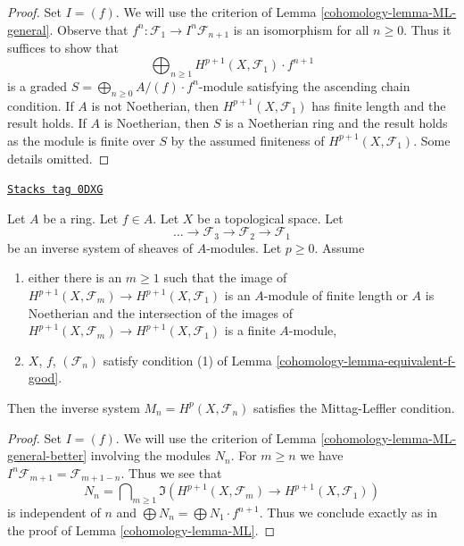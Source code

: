 \begin{proof}

Set $I = (f)$. We will use the criterion of Lemma \ref{cohomology-lemma-ML-general}.
Observe that $f^n : \mathcal{F}_1 \to I^n\mathcal{F}_{n + 1}$
is an isomorphism for all $n \geq 0$.
Thus it suffices to show that
$$
\bigoplus\nolimits_{n \geq 1} H^{p + 1}(X, \mathcal{F}_1) \cdot f^{n + 1}
$$
is a graded $S = \bigoplus_{n \geq 0} A/(f) \cdot f^n$-module satisfying the
ascending chain condition. If $A$ is not Noetherian, then
$H^{p + 1}(X, \mathcal{F}_1)$ has finite length and the result holds.
If $A$ is Noetherian, then $S$ is a Noetherian ring and the result
holds as the module is finite over $S$ by the assumed finiteness
of $H^{p + 1}(X, \mathcal{F}_1)$. Some details omitted.
\end{proof}

\begin{lemma}[ML better]
\label{cohomology-lemma-ML-better}
\href{https://stacks.math.columbia.edu/tag/0DXG}{\texttt{Stacks tag 0DXG}}

Let $A$ be a ring. Let $f \in A$. Let $X$ be a topological space. Let
$$
\ldots \to \mathcal{F}_3 \to \mathcal{F}_2 \to \mathcal{F}_1
$$
be an inverse system of sheaves of $A$-modules. Let $p \geq 0$. Assume
\begin{enumerate}
\item either there is an $m \geq 1$ such that the image of
$H^{p + 1}(X, \mathcal{F}_m) \to H^{p + 1}(X, \mathcal{F}_1)$
is an $A$-module of finite length or $A$ is Noetherian
and the intersection of the images of
$H^{p + 1}(X, \mathcal{F}_m) \to H^{p + 1}(X, \mathcal{F}_1)$
is a finite $A$-module,
\item $X$, $f$, $(\mathcal{F}_n)$ satisfy condition (1) of
Lemma \ref{cohomology-lemma-equivalent-f-good}.
\end{enumerate}
Then the inverse system $M_n = H^p(X, \mathcal{F}_n)$ satisfies the
Mittag-Leffler condition.
\end{lemma}

\begin{proof}

Set $I = (f)$. We will use the criterion of Lemma \ref{cohomology-lemma-ML-general-better}
involving the modules $N_n$. For $m \geq n$ we have
$I^n\mathcal{F}_{m + 1} = \mathcal{F}_{m + 1 - n}$. Thus we see that
$$
N_n = \bigcap\nolimits_{m \geq 1} \Im\left(
H^{p + 1}(X, \mathcal{F}_m) \to H^{p + 1}(X, \mathcal{F}_1)
\right)
$$
is independent of $n$ and
$\bigoplus N_n = \bigoplus N_1 \cdot f^{n + 1}$.
Thus we conclude exactly as in the proof of Lemma \ref{cohomology-lemma-ML}.
\end{proof}

